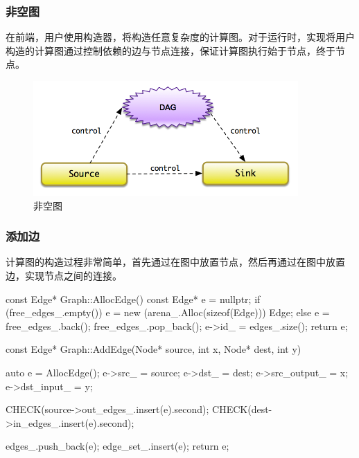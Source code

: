\begin{content}
\subsubsection{非空图}

在前端，用户使用构造器，将构造任意复杂度的计算图。对于运行时，实现将用户构造的计算图通过控制依赖的边与节点连接，保证计算图执行始于节点，终于节点。

\begin{figure}[H]
\centering
\includegraphics[width=0.9\textwidth]{figures/cc-non-empty-graph.png}
\caption{非空图}
 \label{fig:cc-non-empty-graph}
\end{figure}

\subsubsection{添加边}

计算图的构造过程非常简单，首先通过在图中放置节点，然后再通过在图中放置边，实现节点之间的连接。

\begin{leftbar}
\begin{c++}
const Edge* Graph::AllocEdge() const {
  Edge* e = nullptr;
  if (free_edges_.empty()) {
    e = new (arena_.Alloc(sizeof(Edge))) Edge;
  } else {
    e = free_edges_.back();
    free_edges_.pop_back();
  }
  e->id_ = edges_.size();
  return e;
}

const Edge* Graph::AddEdge(Node* source, int x, Node* dest, int y) {
  auto e = AllocEdge();
  e->src_ = source;
  e->dst_ = dest;
  e->src_output_ = x;
  e->dst_input_ = y;

  CHECK(source->out_edges_.insert(e).second);
  CHECK(dest->in_edges_.insert(e).second);

  edges_.push_back(e);
  edge_set_.insert(e);
  return e;
}
\end{c++}
\end{leftbar}


\end{content}
